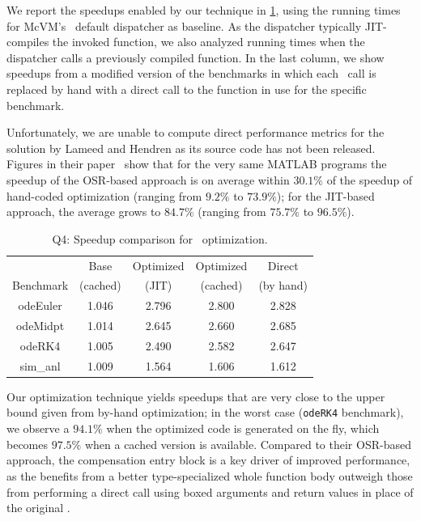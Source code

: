 {We report the speedups enabled by our technique in \mytable\ref{tab:CS-feval}, using the running times for McVM's \feval\ default dispatcher as baseline. As the dispatcher typically JIT-compiles the invoked function, we also analyzed running times when the dispatcher calls a previously compiled function. In the last column, we show speedups from a modified version of the benchmarks in which each \feval\ call is replaced by hand with a direct call to the function in use for the specific benchmark.

Unfortunately, we are unable to compute direct performance metrics for the solution by Lameed and Hendren as its source code has not been released. Figures in their paper~\cite{Lameed2013b} show that for the very same MATLAB programs the speedup of the OSR-based approach is on average within $30.1\%$ of the speedup of hand-coded optimization (ranging from $9.2\%$ to $73.9\%$); for the JIT-based approach, the average grows to $84.7\%$ (ranging from $75.7\%$ to $96.5\%$).

\begin{table}[ht!]
\begin{center}
\vspace{4mm}
\begin{small}
\begin{tabular}{ |c|c|c|c|c| }
\cline{2-5}
\multicolumn{1}{c|}{} & Base & Optimized & Optimized & Direct \\ 
\cline{1-1}
Benchmark & (cached) & (JIT) & (cached) & (by hand) \\
\hline
\hline
odeEuler & 1.046 & 2.796 & 2.800 & 2.828 \\ 
\hline
odeMidpt & 1.014 & 2.645 & 2.660 & 2.685 \\ 
\hline
odeRK4 & 1.005 & 2.490 & 2.582 & 2.647 \\ 
\hline
sim\_anl & 1.009 & 1.564 & 1.606 & 1.612 \\ 
\hline
\end{tabular}
\end{small}
\end{center}
\caption{\label{tab:CS-feval} Q4: Speedup comparison for \feval\ optimization.} 
\end{table}

\noindent Our optimization technique yields speedups that are very close to the upper bound given from by-hand optimization; in the worst case ({\tt odeRK4} benchmark), we observe a $94.1\%$ when the optimized code is generated on the fly, which becomes $97.5\%$ when a cached version is available. Compared to their OSR-based approach, the compensation entry block is a key driver of improved performance, as the benefits from a better type-specialized whole function body outweigh those from performing a direct call using boxed arguments and return values in place of the original \feval.

}
